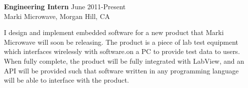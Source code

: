 \textbf{Engineering Intern} \hfill June 2011-Present \\
Marki Microwave, Morgan Hill, CA\\

\begin{description}  \itemsep -2pt %
\item I design and implement embedded software for a new product that 
Marki Microwave will soon be releasing. The product is a piece of lab
test equipment which interfaces wirelessly with software.on a PC to
provide test data to users. When fully complete, the product will be
fully integrated with LabView, and an API will be provided such that
software written in any programming language will be able to interface
with the product.
\end{description}
